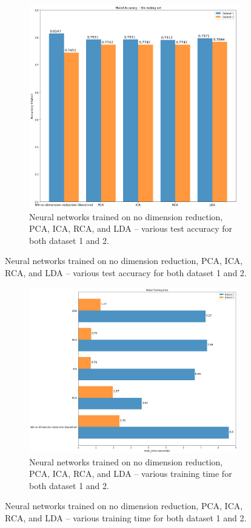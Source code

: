 \documentclass[
letterpaper, %
]{IEEEtran}
\begin{document}
	\begin{figure}[!b]
		\begin{subfigure}{1.0\linewidth}
			\centering
			\includegraphics[width=\linewidth]{./images/nn/testAcc.png}
			\caption{Neural networks trained on no dimension reduction, PCA, ICA, RCA, and LDA -- various test accuracy for both dataset 1 and 2.}
			\label{fig:nnTestr}
		\end{subfigure}
	\end{figure}
	\begin{figure}[ht]\ContinuedFloat
		\begin{subfigure}{.5\textwidth}
			\centering
			\includegraphics[width=\linewidth]{./images/nn/trainTime.png}
			\caption{Neural networks trained on no dimension reduction, PCA, ICA, RCA, and LDA -- various training time for both dataset 1 and 2.}
			\label{fig:nnTrain}
		\end{subfigure}
	\end{figure}
	
\end{document}
